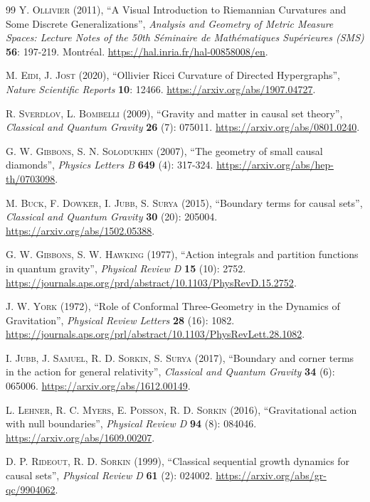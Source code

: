 \documentclass{article}
\begin{document}
\begin{thebibliography}{99}
\textsc{Y. Ollivier} (2011), ``A Visual Introduction to Riemannian Curvatures and Some Discrete Generalizations'', \textit{Analysis and Geometry of Metric Measure Spaces: Lecture Notes of the 50th S\'eminaire de Math\'ematiques Sup\'erieures (SMS)} \textbf{56}: 197-219. Montr\'eal. \url{https://hal.inria.fr/hal-00858008/en}.

\textsc{M. Eidi, J. Jost} (2020), ``Ollivier Ricci Curvature of Directed Hypergraphs'', \textit{Nature Scientific Reports} \textbf{10}: 12466. \url{https://arxiv.org/abs/1907.04727}.

\textsc{R. Sverdlov, L. Bombelli} (2009), ``Gravity and matter in causal set theory'', \textit{Classical and Quantum Gravity} \textbf{26} (7): 075011. \url{https://arxiv.org/abs/0801.0240}.

\textsc{G. W. Gibbons, S. N. Solodukhin} (2007), ``The geometry of small causal diamonds'', \textit{Physics Letters B} \textbf{649} (4): 317-324. \url{https://arxiv.org/abs/hep-th/0703098}.

\textsc{M. Buck, F. Dowker, I. Jubb, S. Surya} (2015), ``Boundary terms for causal sets'', \textit{Classical and Quantum Gravity} \textbf{30} (20): 205004. \url{https://arxiv.org/abs/1502.05388}.

\textsc{G. W. Gibbons, S. W. Hawking} (1977), ``Action integrals and partition functions in quantum gravity'', \textit{Physical Review D} \textbf{15} (10): 2752. \url{https://journals.aps.org/prd/abstract/10.1103/PhysRevD.15.2752}.

\textsc{J. W. York} (1972), ``Role of Conformal Three-Geometry in the Dynamics of Gravitation'', \textit{Physical Review Letters} \textbf{28} (16): 1082. \url{https://journals.aps.org/prl/abstract/10.1103/PhysRevLett.28.1082}.

\textsc{I. Jubb, J. Samuel, R. D. Sorkin, S. Surya} (2017), ``Boundary and corner terms in the action for general relativity'', \textit{Classical and Quantum Gravity} \textbf{34} (6): 065006. \url{https://arxiv.org/abs/1612.00149}.

\textsc{L. Lehner, R. C. Myers, E. Poisson, R. D. Sorkin} (2016), ``Gravitational action with null boundaries'', \textit{Physical Review D} \textbf{94} (8): 084046. \url{https://arxiv.org/abs/1609.00207}.

\textsc{D. P. Rideout, R. D. Sorkin} (1999), ``Classical sequential growth dynamics for causal sets'', \textit{Physical Review D} \textbf{61} (2): 024002. \url{https://arxiv.org/abs/gr-qc/9904062}.


\end{thebibliography}
\end{document}
